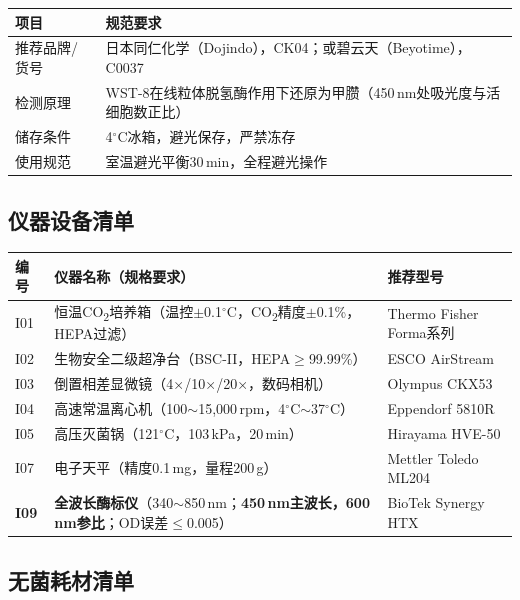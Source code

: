 \documentclass[12pt,a4paper]{article}
\newcommand{\degC}{$^\circ$C}
\begin{document}
\begin{center}
\begin{tabular}{ll}
\toprule
\rowcolor{tabheadbg}\color{white}\textbf{项目} & \color{white}\textbf{规范要求} \\
\midrule
推荐品牌/货号 & 日本同仁化学（Dojindo），CK04；或碧云天（Beyotime），C0037 \\
检测原理 & WST-8在线粒体脱氢酶作用下还原为甲臜（450\,nm处吸光度与活细胞数正比）\cite{ref18} \\
储存条件 & 4\degC{}冰箱，避光保存，严禁冻存 \\
使用规范 & 室温避光平衡30\,min，全程避光操作 \\
\bottomrule
\end{tabular}
\end{center}

\subsection{仪器设备清单}

\begin{center}
\begin{tabularx}{\textwidth}{lXX}
\toprule
\rowcolor{tabheadbg}\color{white}\textbf{编号} & \color{white}\textbf{仪器名称（规格要求）} & \color{white}\textbf{推荐型号} \\
\midrule
I01 & 恒温CO\textsubscript{2}培养箱（温控$\pm$0.1\degC{}，CO\textsubscript{2}精度$\pm$0.1\%，HEPA过滤）& Thermo Fisher Forma系列 \\
I02 & 生物安全二级超净台（BSC-II，HEPA$\geq$99.99\%）& ESCO AirStream \\
I03 & 倒置相差显微镜（4×/10×/20×，数码相机）& Olympus CKX53 \\
I04 & 高速常温离心机（100$\sim$15,000\,rpm，4\degC{}$\sim$37\degC{}）& Eppendorf 5810R \\
I05 & 高压灭菌锅（121\degC{}，103\,kPa，20\,min）& Hirayama HVE-50 \\
I07 & 电子天平（精度0.1\,mg，量程200\,g）& Mettler Toledo ML204 \\
\textbf{I09} & \textbf{全波长酶标仪}（340$\sim$850\,nm；\textbf{450\,nm主波长，600\,nm参比}；OD误差$\leq$0.005）& BioTek Synergy HTX \\
\bottomrule
\end{tabularx}
\end{center}

\subsection{无菌耗材清单}
\end{document}
